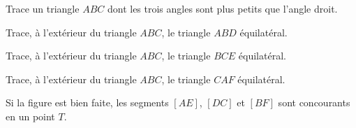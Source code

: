 \begin{myenumerate}
  \item Trace un triangle $ABC$ dont les trois angles sont plus petits
    que l'angle droit.
  \item Trace, à l'extérieur du triangle $ABC$, le triangle $ABD$
    équilatéral.
  \item Trace, à l'extérieur du triangle $ABC$, le triangle $BCE$
    équilatéral.
  \item Trace, à l'extérieur du triangle $ABC$, le triangle $CAF$
    équilatéral.
  \item Si la figure est bien faite, les segments $[AE]$, $[DC]$ et
    $[BF]$ sont concourants en un point $T$.
\end{myenumerate}